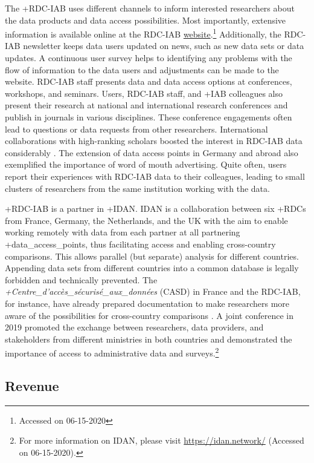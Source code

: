 \documentclass[
]{book}
\begin{document}
The +RDC-IAB\textbar{} uses different channels to inform interested researchers about the data products and data access possibilities. Most importantly, extensive information is available online at the RDC-IAB \href{https://fdz.iab.de/en.aspx}{website}.\footnote{Accessed on 06-15-2020} Additionally, the RDC-IAB newsletter keeps data users updated on news, such as new data sets or data updates. A continuous user survey helps to identifying any problems with the flow of information to the data users and adjustments can be made to the website. RDC-IAB staff presents data and data access options at conferences, workshops, and seminars. Users, RDC-IAB staff, and +IAB\textbar{} colleagues also present their research at national and international research conferences and publish in journals in various disciplines. These conference engagements often lead to questions or data requests from other researchers. International collaborations with high-ranking scholars boosted the interest in RDC-IAB data considerably \citep{card2015, schmieder2016}. The extension of data access points in Germany and abroad also exemplified the importance of word of mouth advertising. Quite often, users report their experiences with RDC-IAB data to their colleagues, leading to small clusters of researchers from the same institution working with the data.

+RDC-IAB\textbar{} is a partner in +IDAN\textbar. IDAN is a collaboration between six +RDC\textbar s from France, Germany, the Netherlands, and the UK with the aim to enable working remotely with data from each partner at all partnering +data\_access\_points\textbar, thus facilitating access and enabling cross-country comparisons. This allows parallel (but separate) analysis for different countries. Appending data sets from different countries into a common database is legally forbidden and technically prevented. The \emph{+Centre\_d'accès\_sécurisé\_aux\_données\textbar{}} (CASD) in France and the RDC-IAB, for instance, have already prepared documentation to make researchers more aware of the possibilities for cross-country comparisons \citep{laible2020}. A joint conference in 2019 promoted the exchange between researchers, data providers, and stakeholders from different ministries in both countries and demonstrated the importance of access to administrative data and surveys.\footnote{For more information on IDAN, please visit \url{https://idan.network/} (Accessed on 06-15-2020).}

\hypertarget{revenue}{%
\subsection{Revenue}\label{revenue}}
\end{document}
